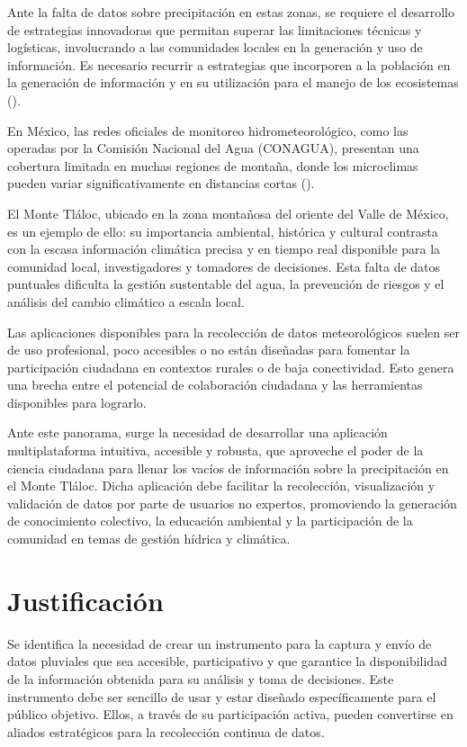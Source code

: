 Ante la falta de datos sobre precipitación en estas zonas, se requiere el desarrollo de estrategias innovadoras que permitan superar las limitaciones técnicas y logísticas, involucrando a las comunidades locales en la generación y uso de información. Es necesario recurrir a estrategias que incorporen a la población en la generación de información y en su utilización para el manejo de los ecosistemas (\cite{hubp1990}).


En México, las redes oficiales de monitoreo hidrometeorológico, como las operadas por la Comisión Nacional del Agua (CONAGUA), presentan una cobertura limitada en muchas regiones de montaña, donde los microclimas pueden variar significativamente en distancias cortas (\cite{rosas2021}).


El Monte Tláloc, ubicado en la zona montañosa del oriente del Valle de México, es un ejemplo de ello: su importancia ambiental, histórica y cultural contrasta con la escasa información climática precisa y en tiempo real disponible para la comunidad local, investigadores y tomadores de decisiones. Esta falta de datos puntuales dificulta la gestión sustentable del agua, la prevención de riesgos y el análisis del cambio climático a escala local.

Las aplicaciones disponibles para la recolección de datos meteorológicos suelen ser de uso profesional, poco accesibles o no están diseñadas para fomentar la participación ciudadana en contextos rurales o de baja conectividad. Esto genera una brecha entre el potencial de colaboración ciudadana y las herramientas disponibles para lograrlo.

Ante este panorama, surge la necesidad de desarrollar una aplicación multiplataforma intuitiva, accesible y robusta, que aproveche el poder de la ciencia ciudadana para llenar los vacíos de información sobre la precipitación en el Monte Tláloc. Dicha aplicación debe facilitar la recolección, visualización y validación de datos por parte de usuarios no expertos, promoviendo la generación de conocimiento colectivo, la educación ambiental y la participación de la comunidad en temas de gestión hídrica y climática.
 

\section{Justificación}
Se identifica la necesidad de crear un instrumento para la captura y envío de datos pluviales que sea accesible, participativo y que garantice la disponibilidad de la información obtenida para su análisis y toma de decisiones. Este instrumento debe ser sencillo de usar y estar diseñado específicamente para el público objetivo. Ellos, a través de su participación activa, pueden convertirse en aliados estratégicos para la recolección continua de datos.

